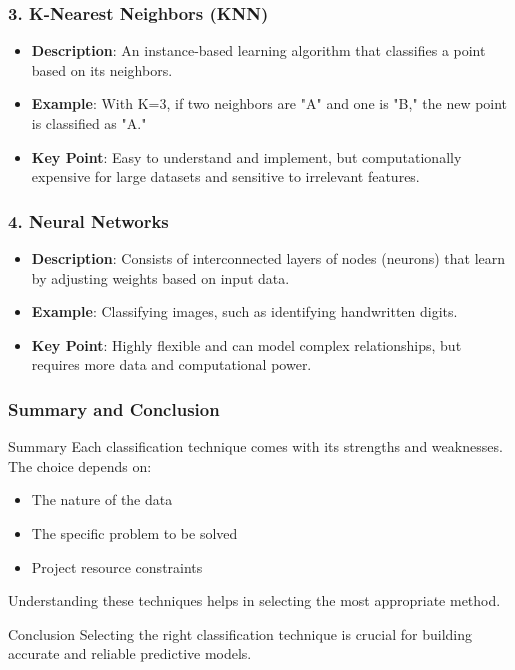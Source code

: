 \documentclass{beamer}
\begin{document}
\begin{frame}[fragile]
    \frametitle{3. K-Nearest Neighbors (KNN)}
    \begin{itemize}
        \item \textbf{Description}: An instance-based learning algorithm that classifies a point based on its neighbors.
        \item \textbf{Example}: With K=3, if two neighbors are "A" and one is "B," the new point is classified as "A."
        \item \textbf{Key Point}: Easy to understand and implement, but computationally expensive for large datasets and sensitive to irrelevant features.
    \end{itemize}
\end{frame}

\begin{frame}[fragile]
    \frametitle{4. Neural Networks}
    \begin{itemize}
        \item \textbf{Description}: Consists of interconnected layers of nodes (neurons) that learn by adjusting weights based on input data.
        \item \textbf{Example}: Classifying images, such as identifying handwritten digits.
        \item \textbf{Key Point}: Highly flexible and can model complex relationships, but requires more data and computational power.
    \end{itemize}
\end{frame}

\begin{frame}[fragile]
    \frametitle{Summary and Conclusion}
    \begin{block}{Summary}
        Each classification technique comes with its strengths and weaknesses. The choice depends on:
        \begin{itemize}
            \item The nature of the data
            \item The specific problem to be solved
            \item Project resource constraints
        \end{itemize}
        Understanding these techniques helps in selecting the most appropriate method.
    \end{block}
    \begin{block}{Conclusion}
        Selecting the right classification technique is crucial for building accurate and reliable predictive models.
    \end{block}
\end{frame}
\end{document}
